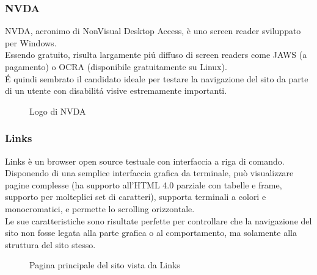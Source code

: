 \documentclass{article}
\begin{document}
\subsubsection*{NVDA}
NVDA, acronimo di NonVisual Desktop Access, è uno screen reader sviluppato per Windows.\\
Essendo gratuito, risulta largamente piú diffuso di screen readers come JAWS (a pagamento) o OCRA (disponibile gratuitamente su Linux).\\
É quindi sembrato il candidato ideale per testare la navigazione del sito da parte di un utente con disabilitá visive estremamente importanti.
\begin{figure}[H]
	\centering
	\caption{Logo di NVDA}
\end{figure}
\subsubsection*{Links}
Links è un browser open source testuale con interfaccia a riga di comando.\\
Disponendo di una semplice interfaccia grafica da terminale, può visualizzare pagine complesse (ha supporto all'HTML 4.0 parziale con tabelle e frame, supporto per molteplici set di caratteri), supporta terminali a colori e monocromatici, e permette lo scrolling orizzontale.\\
Le sue caratteristiche sono risultate perfette per controllare che la navigazione del sito non fosse legata alla parte grafica o al comportamento, ma solamente alla struttura del sito stesso.

\begin{figure}[H]
	\centering
	\caption{Pagina principale del sito vista da Links}
\end{figure}
\end{document}
